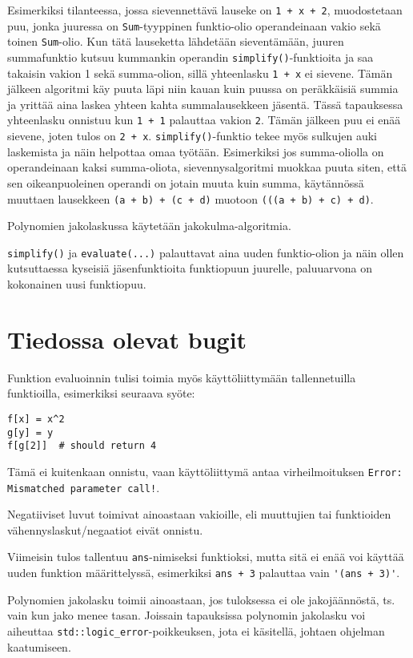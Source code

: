 \documentclass[10pt,a4paper]{article}
\begin{document}
Esimerkiksi tilanteessa, jossa sievennettävä lauseke on \lstinline!1 + x + 2!, muodostetaan puu, jonka juuressa on \lstinline!Sum!-tyyppinen funktio-olio operandeinaan vakio sekä toinen \lstinline!Sum!-olio. Kun tätä lauseketta lähdetään sieventämään, juuren summafunktio kutsuu kummankin operandin \lstinline!simplify()!-funktioita ja saa takaisin vakion 1 sekä summa-olion, sillä yhteenlasku \lstinline!1 + x! ei sievene. Tämän jälkeen algoritmi käy puuta läpi niin kauan kuin puussa on peräkkäisiä summia ja yrittää aina laskea yhteen kahta summalausekkeen jäsentä. Tässä tapauksessa yhteenlasku onnistuu kun \lstinline!1 + 1! palauttaa vakion \lstinline!2!. Tämän jälkeen puu ei enää sievene, joten tulos on \lstinline!2 + x!. \lstinline!simplify()!-funktio tekee myös sulkujen auki laskemista ja näin helpottaa omaa työtään. Esimerkiksi jos summa-oliolla on operandeinaan kaksi summa-oliota, sievennysalgoritmi muokkaa puuta siten, että sen oikeanpuoleinen operandi on jotain muuta kuin summa, käytännössä muuttaen lausekkeen \lstinline!(a + b) + (c + d)! muotoon \lstinline!(((a + b) + c) + d)!.

Polynomien jakolaskussa käytetään jakokulma-algoritmia. \cite[s. 9]{Lutes04}

\lstinline!simplify()! ja \lstinline!evaluate(...)! palauttavat aina uuden funktio-olion ja näin ollen kutsuttaessa kyseisiä jäsenfunktioita funktiopuun juurelle, paluuarvona on kokonainen uusi funktiopuu.

\section{Tiedossa olevat bugit}
Funktion evaluoinnin tulisi toimia myös käyttöliittymään tallennetuilla funktioilla, esimerkiksi seuraava syöte:
\begin{lstlisting}
f[x] = x^2
g[y] = y
f[g[2]]  # should return 4
\end{lstlisting}
Tämä ei kuitenkaan onnistu, vaan käyttöliittymä antaa virheilmoituksen \texttt{Error: Mismatched parameter call!}.

Negatiiviset luvut toimivat ainoastaan vakioille, eli muuttujien tai funktioiden vähennyslaskut/negaatiot eivät onnistu.

Viimeisin tulos tallentuu \lstinline!ans!-nimiseksi funktioksi, mutta sitä ei enää voi käyttää uuden funktion määrittelyssä, esimerkiksi \lstinline!ans + 3! palauttaa vain \lstinline!'(ans + 3)'!.

Polynomien jakolasku toimii ainoastaan, jos tuloksessa ei ole jakojäännöstä, ts. vain kun jako menee tasan.
Joissain tapauksissa polynomin jakolasku voi aiheuttaa \lstinline!std::logic_error!-poikkeuksen, jota ei käsitellä, johtaen ohjelman kaatumiseen.
\end{document}
